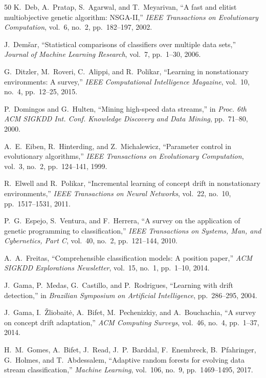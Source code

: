 \documentclass[lettersize,journal]{IEEEtran}
\begin{document}
\begin{thebibliography}{50}
K.~Deb, A.~Pratap, S.~Agarwal, and T.~Meyarivan, ``A fast and elitist multiobjective genetic algorithm: NSGA-II,'' \textit{IEEE Transactions on Evolutionary Computation}, vol.~6, no.~2, pp.~182--197, 2002.

J.~Dem\v{s}ar, ``Statistical comparisons of classifiers over multiple data sets,'' \textit{Journal of Machine Learning Research}, vol.~7, pp.~1--30, 2006.

G.~Ditzler, M.~Roveri, C.~Alippi, and R.~Polikar, ``Learning in nonstationary environments: A survey,'' \textit{IEEE Computational Intelligence Magazine}, vol.~10, no.~4, pp.~12--25, 2015.

P.~Domingos and G.~Hulten, ``Mining high-speed data streams,'' in \textit{Proc. 6th ACM SIGKDD Int. Conf. Knowledge Discovery and Data Mining}, pp.~71--80, 2000.

A.~E.~Eiben, R.~Hinterding, and Z.~Michalewicz, ``Parameter control in evolutionary algorithms,'' \textit{IEEE Transactions on Evolutionary Computation}, vol.~3, no.~2, pp.~124--141, 1999.

R.~Elwell and R.~Polikar, ``Incremental learning of concept drift in nonstationary environments,'' \textit{IEEE Transactions on Neural Networks}, vol.~22, no.~10, pp.~1517--1531, 2011.

P.~G.~Espejo, S.~Ventura, and F.~Herrera, ``A survey on the application of genetic programming to classification,'' \textit{IEEE Transactions on Systems, Man, and Cybernetics, Part C}, vol.~40, no.~2, pp.~121--144, 2010.

A.~A.~Freitas, ``Comprehensible classification models: A position paper,'' \textit{ACM SIGKDD Explorations Newsletter}, vol.~15, no.~1, pp.~1--10, 2014.

J.~Gama, P.~Medas, G.~Castillo, and P.~Rodrigues, ``Learning with drift detection,'' in \textit{Brazilian Symposium on Artificial Intelligence}, pp.~286--295, 2004.

J.~Gama, I.~\v{Z}liobait\.{e}, A.~Bifet, M.~Pechenizkiy, and A.~Bouchachia, ``A survey on concept drift adaptation,'' \textit{ACM Computing Surveys}, vol.~46, no.~4, pp.~1--37, 2014.

H.~M.~Gomes, A.~Bifet, J.~Read, J.~P.~Barddal, F.~Enembreck, B.~Pfahringer, G.~Holmes, and T.~Abdessalem, ``Adaptive random forests for evolving data stream classification,'' \textit{Machine Learning}, vol.~106, no.~9, pp.~1469--1495, 2017.


\end{thebibliography}
\end{document}
